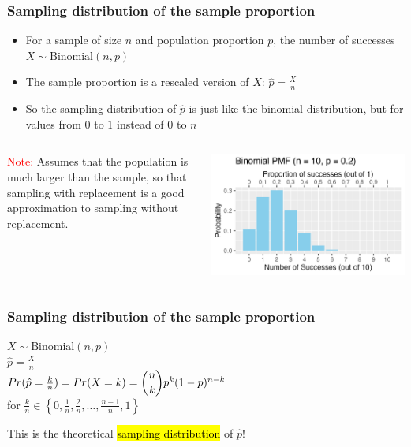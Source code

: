 \documentclass[t,compress,mathserif]{beamer}
\begin{document}
\begin{frame}
\frametitle{Sampling distribution of the sample proportion}
    \begin{itemize}
        \item For a sample of size $n$ and population proportion $p$, the number of successes $X \sim \text{Binomial}(n, p)$
        \item The sample proportion is a rescaled version of $X$: $\hat{p} = \frac{X}{n}$
        \item So the sampling distribution of $\hat{p}$ is just like the binomial distribution, but for values from $0$ to $1$ instead of $0$ to $n$
    \end{itemize}
    \vspace{2em}
    \begin{columns}[T] 
        \begin{column}{0.4\textwidth}
            \vspace{2em} 
            \footnotesize{\textcolor{red}{Note:} Assumes that the population is much larger than the sample, so that sampling with replacement is a good approximation to sampling without replacement.}
        \end{column}
        \begin{column}{0.6\textwidth}
            \includegraphics[width=\textwidth]{sampling_dist_of_phat.png}
        \end{column}
    \end{columns}
\end{frame}


\begin{frame}
\frametitle{Sampling distribution of the sample proportion}

$X \sim \text{Binomial}(n, p)$ \\
$\hat{p}  = \frac{X}{n}$ \\
\pause
\vspace{1em}
\textcolor{orange}{$Pr(\hat{p}  = \frac{k}{n}) = Pr(X = k) = \dbinom{n}{k} p^k (1-p)^{n-k}$} \\
for $\frac{k}{n} \in \left\{0, \frac{1}{n}, \frac{2}{n}, \ldots, \frac{n-1}{n}, 1\right\}$
\pause

This is the theoretical \hl{sampling distribution} of $\hat{p}$!
\end{frame}
\end{document}
